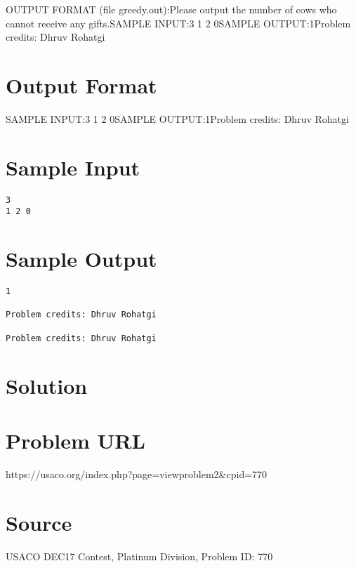\documentclass[12pt]{article}
\begin{document}
OUTPUT FORMAT (file greedy.out):Please output the number of cows who cannot receive any gifts.SAMPLE INPUT:3
1 2 0SAMPLE OUTPUT:1Problem credits: Dhruv Rohatgi

\section*{Output Format}
SAMPLE INPUT:3
1 2 0SAMPLE OUTPUT:1Problem credits: Dhruv Rohatgi

\section*{Sample Input}
\begin{verbatim}
3
1 2 0
\end{verbatim}

\section*{Sample Output}
\begin{verbatim}
1

Problem credits: Dhruv Rohatgi

Problem credits: Dhruv Rohatgi
\end{verbatim}

\section*{Solution}


\section*{Problem URL}
https://usaco.org/index.php?page=viewproblem2&cpid=770

\section*{Source}
USACO DEC17 Contest, Platinum Division, Problem ID: 770
\end{document}
